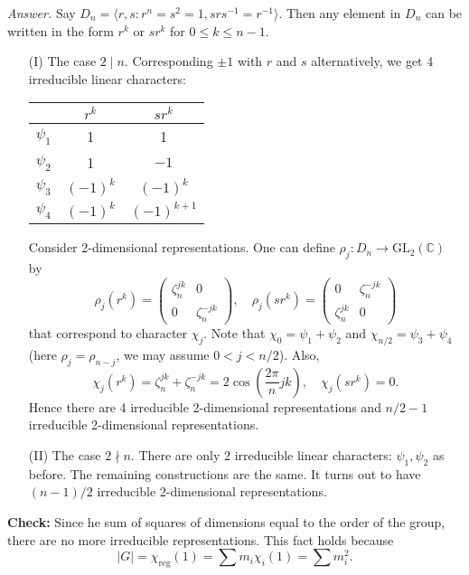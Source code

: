 \documentclass{mathproblems}
\newcommand\C{\mathbb{C}}
\newcommand\GL{\mathrm{GL}}
\begin{document}
\begin{questions}
\textit{Answer.} Say $D_n=\langle r,s: r^n=s^2=1, s r s^{-1}=r^{-1}\rangle$. Then any element in $D_n$ can be written in the form $r^k$ or $s r^k$ for $0\leq k\leq n-1$. \begin{itemize}
\item[(I)] The case $2\mid n$. Corresponding $\pm 1$ with $r$ and $s$ alternatively, we get 4 irreducible linear characters:
\begin{center}
\begin{tabular}{c|cc} 
& $r^{k}$ & $s r^{k}$ \\
\hline$\psi_{1}$ & 1 & 1 \\
$\psi_{2}$ & 1 & $-1$ \\
$\psi_{3}$ & $(-1)^{k}$ & $(-1)^{k}$ \\
$\psi_{4}$ & $(-1)^{k}$ & $(-1)^{k+1}$
\end{tabular}
\end{center}
Consider 2-dimensional representations. One can define $\rho_j:D_n\to \GL_2(\C)$ by
$$
\rho_j(r^k)=\begin{pmatrix}
\zeta_n^{jk} & 0 \\ 0 & \zeta_n^{-jk}
\end{pmatrix},\quad \rho_j(s r^k)=\begin{pmatrix}
0 & \zeta_n^{-jk} \\ \zeta_n^{jk} & 0
\end{pmatrix}
$$
that correspond to character $\chi_j$. Note that $\chi_0=\psi_1+\psi_2$ and $\chi_{n/2}=\psi_3+\psi_4$ (here $\rho_j=\rho_{n-j}$, we may assume $0<j<n/2$). Also,
$$
\chi_j(r^k)=\zeta_n^{jk}+\zeta_n^{-jk}=2\cos (\frac{2\pi}{n}j k),\quad \chi_j(sr^k)=0.
$$
Hence there are 4 irreducible 2-dimensional representations and $n/2-1$ irreducible 2-dimensional representations.

\item[(II)] The case $2\nmid n$. There are only 2 irreducible linear characters: $\psi_1,\psi_2$ as before. The remaining constructions are the same. It turns out to have $(n-1)/2$ irreducible 2-dimensional representations.
\end{itemize}
\textbf{Check:} Since he sum of squares of dimensions equal to the order of the
group, there are no more irreducible representations. This fact holds because
$$
|G|=\chi_{\operatorname{reg}}(1)=\sum m_i \chi_i(1)=\sum m_i^2.
$$



\end{questions}
\end{document}
